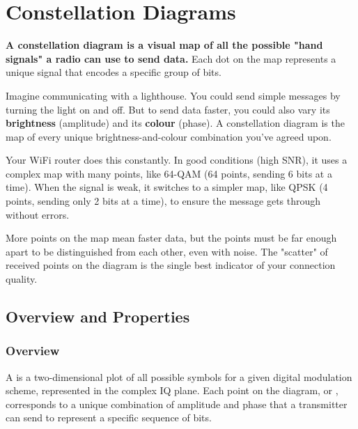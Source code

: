 
\chapter{Constellation Diagrams}
\label{ch:constellations}

\begin{nontechnical}
    \textbf{A constellation diagram is a visual map of all the possible "hand signals" a radio can use to send data.} Each dot on the map represents a unique signal that encodes a specific group of bits.

     Imagine communicating with a lighthouse. You could send simple messages by turning the light on and off. But to send data faster, you could also vary its \textbf{brightness} (amplitude) and its \textbf{colour} (phase). A constellation diagram is the map of every unique brightness-and-colour combination you've agreed upon.

     Your WiFi router does this constantly. In good conditions (high SNR), it uses a complex map with many points, like 64-QAM (64 points, sending 6 bits at a time). When the signal is weak, it switches to a simpler map, like QPSK (4 points, sending only 2 bits at a time), to ensure the message gets through without errors.

     More points on the map mean faster data, but the points must be far enough apart to be distinguished from each other, even with noise. The "scatter" of received points on the diagram is the single best indicator of your connection quality.
\end{nontechnical}


\section{Overview and Properties}

\subsection{Overview}

A  is a two-dimensional plot of all possible symbols for a given digital modulation scheme, represented in the complex IQ plane. Each point on the diagram, or , corresponds to a unique combination of amplitude and phase that a transmitter can send to represent a specific sequence of bits.

